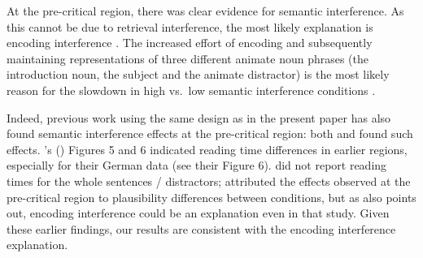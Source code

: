 \documentclass[a4paper, man, floatsintext]{apa7}
\begin{document}
At the pre-critical region, there was clear evidence for semantic interference. As this cannot be due to retrieval interference, the most likely explanation is encoding interference \citep{Oberauer_Kliegl_2006}. The increased effort of encoding and subsequently maintaining representations of three different animate noun phrases (the introduction noun, the subject and the animate distractor) is the most likely reason for the slowdown in high vs.\ low semantic interference conditions \citep[for similar findings, see e.g., ][]{lago_etal_2021, ness2019, ness2017, kush_etal_2015, gordon02}. 

Indeed, previous work using the same design as in the present paper has also found semantic interference effects at the pre-critical region: both \textcite{vandyke07} and \textcite{mertzen} found such effects. \citeauthor{mertzen}'s (\citeyear{mertzen}) Figures 5 and 6 indicated reading time differences in earlier regions, especially for their German data (see their Figure 6). \textcite{vandyke07} did not report reading times for the whole sentences / distractors;  \citeauthor{vandyke07} attributed the effects observed at the pre-critical region to plausibility differences between conditions, but as \textcite{mertzen} also points out, encoding interference could be an explanation even in that study. Given these earlier findings, our results are consistent with the encoding interference explanation.
\end{document}

